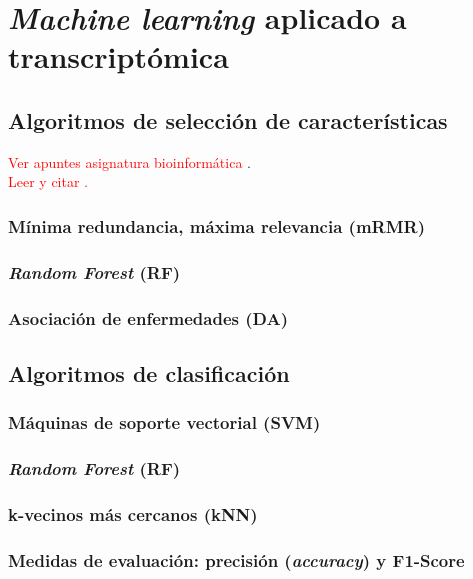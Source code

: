 \chapter{\textit{Machine learning} aplicado a transcriptómica}

\section{Algoritmos de selección de características}

\textcolor{red}{Ver apuntes asignatura bioinformática} \cite{HerreraMaldonado2020}.\\

\textcolor{red}{Leer y citar \cite{Xing}.}\\



\subsection{Mínima redundancia, máxima relevancia (mRMR)}

\subsection{\textit{Random Forest} (RF)}

\subsection{Asociación de enfermedades (DA)}

\section{Algoritmos de clasificación}

\subsection{Máquinas de soporte vectorial (SVM)}

\subsection{\textit{Random Forest} (RF)}

\subsection{k-vecinos más cercanos (kNN)}

\subsection{Medidas de evaluación: precisión (\textit{accuracy}) y F1-Score}


